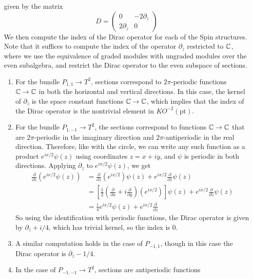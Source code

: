 \begin{exmp}
given by the matrix
\[
D = \begin{pmatrix}
0 & -2\partial_z \\
2\partial_{\overline{z}} & 0
\end{pmatrix}
\]
We then compute the index of the Dirac operator for each of the Spin structures.
Note that it suffices to compute the index of the operator $\partial_{\overline{z}}$
restricted to $\mathbb{C}$, where we use the equivalence of graded modules with ungraded modules
over the even subalgebra, and restrict the Dirac operator to the even subspace
of sections.
\begin{enumerate}
  \item For the bundle $P_{1,1} \to T^2$, sections correspond to $2\pi$-periodic
  functions $\mathbb{C} \to \mathbb{C}$ in both the horizontal and vertical directions. In this case,
  the kernel of $\partial_{\overline{z}}$ is the space constant functions $\mathbb{C} \to \mathbb{C}$,
  which implies that the index of the Dirac operator is the nontrivial element
  in $KO^{-2}(\mathrm{pt})$.
  \item For the bundle $P_{1,-1} \to T^2$, the sections correspond to functions
  $\mathbb{C} \to \mathbb{C}$ that are $2\pi$-periodic in the imaginary direction and
  $2\pi$-antiperiodic in the real direction. Therefore, like with the circle,
  we can write any such function as a product $e^{ix/2}\psi(z)$ using coordinates
  $z = x + iy$, and $\psi$ is periodic in both directions. Applying
  $\partial_{\overline{z}}$ to $e^{ix/2}\psi(z)$, we get
  \begin{align*}
  \frac{\partial}{\partial\overline{z}}(e^{ix/2}\psi(z))
  &= \frac{\partial}{\partial\overline{z}}(e^{ix/2})\psi(z)
  + e^{ix/2}\frac{\partial}{\partial\overline{z}}\psi(z) \\[5pt]
  &= \left[\frac{1}{2}\left(\frac{\partial}{\partial x}
  + i \frac{\partial}{\partial y}\right)(e^{ix/2}) \right] \psi(z)
  + e^{ix/2}\frac{\partial}{\partial\overline{z}}\psi(z) \\[5pt]
  &= \frac{i}{4}e^{ix/2}\psi(z) + e^{ix/2}\frac{\partial}{\partial\overline{z}}
  \end{align*}
  So using the identification with periodic functions, the Dirac operator is given by
  $\partial_{\overline{z}} + i/4$, which has trivial kernel, so the index is
  $0$.
  \item A similar computation holds in the case of $P_{-1,1}$, though in this case
  the Dirac operator is $\partial_{\overline{z}} - 1/4$.
  \item In the case of $P_{-1,-1} \to T^2$, sections are antiperiodic functions

\end{enumerate}
\end{exmp}
